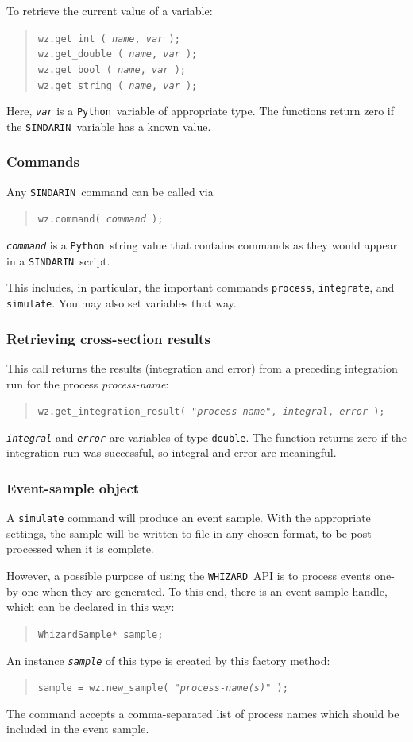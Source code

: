 \documentclass[12pt]{book}
\newcommand{\ttt}[1]{\texttt{#1}}
\newcommand{\whizard}{\ttt{WHIZARD}}
\newcommand{\sindarin}{\ttt{SINDARIN}}
\newcommand{\python}{\ttt{Python}}
\begin{document}
To retrieve the current value of a variable:
\begin{quote}
  \tt wz.get\_int ( \textit{name}, \textit{var} );
  \\
  \tt wz.get\_double ( \textit{name}, \textit{var} );
  \\
  \tt wz.get\_bool ( \textit{name}, \textit{var} );
  \\
  \tt wz.get\_string ( \textit{name}, \textit{var} );
\end{quote}
Here, \ttt{\it var} is a \python\ variable of appropriate type.  The
functions return zero if the \sindarin\ variable has a known value.

\subsubsection{Commands}
Any \sindarin\ command can be called via
\begin{quote}
  \tt wz.command( \textit{command} );
\end{quote}
\ttt{\it command} is a \python\ string value that contains commands as they
would appear in a \sindarin\ script.

This includes, in particular, the important commands \ttt{process},
\ttt{integrate}, and \ttt{simulate}.  You may also set variables that way.

\subsubsection{Retrieving cross-section results}
This call returns the results (integration and error) from a preceding
integration run for the process \textit{process-name}:
\begin{quote}
  \tt wz.get\_integration\_result( "\textit{process-name}",
  \textit{integral}, \textit{error} );
\end{quote}
\ttt{\it integral} and \ttt{\it error} are variables of type \ttt{double}.
The function returns zero if the integration run was successful, so integral
and error are meaningful.

\subsubsection{Event-sample object}
A \ttt{simulate} command will produce an event sample.  With the appropriate
settings, the sample will be written to file in any chosen format, to be
post-processed when it is complete.

However, a possible purpose of using the \whizard\ API is to process events one-by-one
when they are generated.  To this end, there is an event-sample handle, which
can be declared in this way:
\begin{quote}
  \tt WhizardSample* {sample};
\end{quote}
An instance \ttt{\it sample} of this type is created by this factory method:
\begin{quote}
  \tt {sample} = wz.new\_sample( "\textit{process-name(s)}" );
\end{quote}
The command accepts a comma-separated list of process names which should be
included in the event sample.
\end{document}
